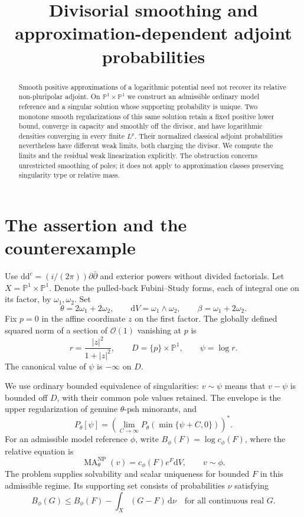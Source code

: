 \documentclass[11pt]{article}
\title{Divisorial smoothing and approximation-dependent adjoint probabilities}
\author{}
\date{}
\newcommand{\ddc}{\mathrm d\mathrm d^c}
\begin{document}
\maketitle
\begin{abstract}
Smooth positive approximations of a logarithmic potential need not recover
its relative non-pluripolar adjoint. On $\mathbb P^1\times\mathbb P^1$ we
construct an admissible ordinary model reference and a singular solution
whose supporting probability is unique. Two monotone smooth regularizations
of this same solution retain a fixed positive lower bound, converge in
capacity and smoothly off the divisor, and have logarithmic densities
converging in every finite $L^p$. Their normalized classical adjoint
probabilities nevertheless have different weak limits, both charging the
divisor. We compute the limits and the residual weak linearization explicitly.
The obstruction concerns unrestricted smoothing of poles; it does not apply
to approximation classes preserving singularity type or relative mass.
\end{abstract}

\section{The assertion and the counterexample}

Use $\ddc=(i/(2\pi))\partial\bar\partial$ and exterior powers without
divided factorials. Let $X=\mathbb P^1\times\mathbb P^1$. Denote the
pulled-back Fubini--Study forms, each of integral one on its factor, by
$\omega_1,\omega_2$. Set
\[
 \theta=2\omega_1+2\omega_2,\qquad
 \mathrm dV=\omega_1\wedge\omega_2,\qquad
 \beta=\omega_1+2\omega_2.
\]
Fix $p=0$ in the affine coordinate $z$ on the first factor. The globally
defined squared norm of a section of $\mathcal O(1)$ vanishing at $p$ is
\[
 r=\frac{|z|^2}{1+|z|^2},\qquad
 D=\{p\}\times\mathbb P^1,\qquad \psi=\log r.
\]
The canonical value of $\psi$ is $-\infty$ on $D$.

We use ordinary bounded equivalence of singularities: $v\sim\psi$ means
that $v-\psi$ is bounded off $D$, with their common pole values retained.
The envelope is the upper regularization of genuine $\theta$-psh
minorants, and
\[
 P_\theta[\psi]=
 \left(\lim_{C\to\infty}P_\theta(\min\{\psi+C,0\})\right)^*.
\]
For an admissible model reference $\phi$, write
$B_\phi(F)=\log c_\phi(F)$, where the relative equation is
\[
 \operatorname{MA}_{\theta}^{\mathrm{NP}}(v)
      =c_\phi(F)e^F\mathrm dV,\qquad v\sim\phi.
\]
The problem supplies solvability and scalar uniqueness for bounded $F$
in this admissible regime. Its supporting set consists of probabilities
$\nu$ satisfying
\[
 B_\phi(G)\le B_\phi(F)-\int_X(G-F)\,\mathrm d\nu
 \quad\text{for all continuous real }G.
\]
\end{document}
